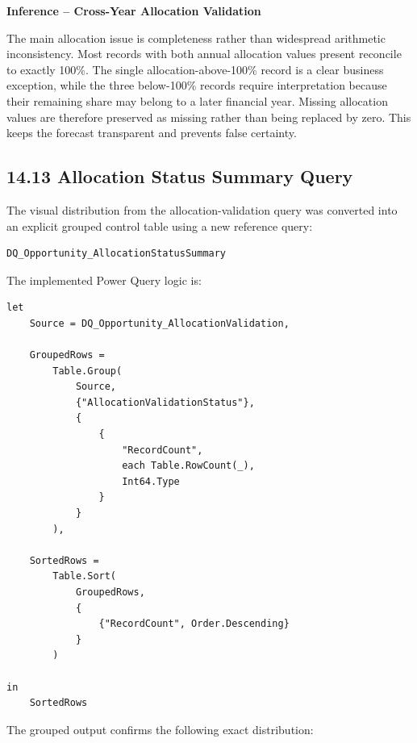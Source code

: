 \documentclass[11pt,a4paper]{article}
\begin{document}
\begin{inferencebox}

\textbf{Inference -- Cross-Year Allocation Validation}

The main allocation issue is completeness rather than widespread arithmetic
inconsistency. Most records with both annual allocation values present reconcile
to exactly 100\%. The single allocation-above-100\% record is a clear business
exception, while the three below-100\% records require interpretation because
their remaining share may belong to a later financial year. Missing allocation
values are therefore preserved as missing rather than being replaced by zero.
This keeps the forecast transparent and prevents false certainty.

\end{inferencebox}

\subsection{14.13 Allocation Status Summary Query}

The visual distribution from the allocation-validation query was converted into
an explicit grouped control table using a new reference query:

\begin{lstlisting}[style=powerquery]
DQ_Opportunity_AllocationStatusSummary
\end{lstlisting}

The implemented Power Query logic is:

\begin{lstlisting}[style=powerquery]
let
    Source = DQ_Opportunity_AllocationValidation,

    GroupedRows =
        Table.Group(
            Source,
            {"AllocationValidationStatus"},
            {
                {
                    "RecordCount",
                    each Table.RowCount(_),
                    Int64.Type
                }
            }
        ),

    SortedRows =
        Table.Sort(
            GroupedRows,
            {
                {"RecordCount", Order.Descending}
            }
        )

in
    SortedRows
\end{lstlisting}

The grouped output confirms the following exact distribution:
\end{document}
